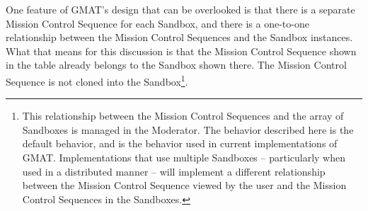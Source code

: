 One feature of GMAT's design that can be overlooked is that there is a separate Mission Control
Sequence for each Sandbox, and there is a one-to-one relationship between the Mission Control
Sequences and the Sandbox instances.  What that means for this discussion is that the Mission
Control Sequence shown in the table already belongs to the Sandbox shown there.  The Mission Control
Sequence is not cloned into the Sandbox\footnote{This relationship between the Mission Control
Sequences and the array of Sandboxes is managed in the Moderator.  The behavior described here is
the default behavior, and is the behavior used in current implementations of GMAT.  Implementations
that use multiple Sandboxes -- particularly when used in a distributed manner -- will implement a
different relationship between the Mission Control Sequence viewed by the user and the Mission
Control Sequences in the Sandboxes.}.

